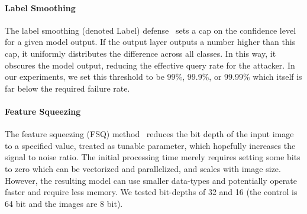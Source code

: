 \documentclass[lettersize,journal]{IEEEtran}
\newcommand{\tl}[1]{\textit{[{\color{red}#1}]}}
\begin{document}







\paragraph{Label Smoothing}
The label smoothing (denoted Label) defense~\cite{label_smoothing} sets a cap on the confidence level for a given model output. If the output layer outputs a number higher than this cap, it uniformly distributes the difference across all classes. In this way, it obscures the model output, reducing the effective query rate for the attacker. In our experiments, we set this threshold to be 99\%,  99.9\%,  or 99.99\% which itself is far below the required failure rate.



\paragraph{Feature Squeezing}
The feature squeezing (FSQ) method~\cite{feature_squeezing} reduces the bit depth of the input image to a specified value, treated as tunable parameter, which hopefully increases the signal to noise ratio. The initial processing time merely requires setting some bits to zero which can be vectorized and parallelized, and scales with image size. However, the resulting model can use smaller data-types and potentially operate faster and require less memory. We tested bit-depths of 32 and 16 (the control is 64 bit and the images are 8 bit).
\end{document}
